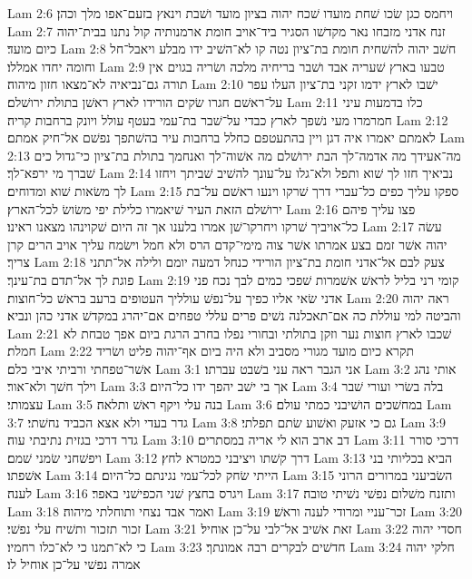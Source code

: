 Lam 2:6  ויחמס כגן שׂכו שׁחת מועדו שׁכח יהוה בציון מועד ושׁבת וינאץ בזעם־אפו מלך וכהן׃
Lam 2:7  זנח אדני מזבחו נאר מקדשׁו הסגיר ביד־אויב חומת ארמנותיה קול נתנו בבית־יהוה כיום מועד׃
Lam 2:8  חשׁב יהוה להשׁחית חומת בת־ציון נטה קו לא־השׁיב ידו מבלע ויאבל־חל וחומה יחדו אמללו׃
Lam 2:9  טבעו בארץ שׁעריה אבד ושׁבר בריחיה מלכה ושׂריה בגוים אין תורה גם־נביאיה לא־מצאו חזון מיהוה׃
Lam 2:10  ישׁבו לארץ ידמו זקני בת־ציון העלו עפר על־ראשׁם חגרו שׂקים הורידו לארץ ראשׁן בתולת ירושׁלם׃
Lam 2:11  כלו בדמעות עיני חמרמרו מעי נשׁפך לארץ כבדי על־שׁבר בת־עמי בעטף עולל ויונק ברחבות קריה׃
Lam 2:12  לאמתם יאמרו איה דגן ויין בהתעטפם כחלל ברחבות עיר בהשׁתפך נפשׁם אל־חיק אמתם׃
Lam 2:13  מה־אעידך מה אדמה־לך הבת ירושׁלם מה אשׁוה־לך ואנחמך בתולת בת־ציון כי־גדול כים שׁברך מי ירפא־לך׃
Lam 2:14  נביאיך חזו לך שׁוא ותפל ולא־גלו על־עונך להשׁיב שׁביתך ויחזו לך משׂאות שׁוא ומדוחים׃
Lam 2:15  ספקו עליך כפים כל־עברי דרך שׁרקו וינעו ראשׁם על־בת ירושׁלם הזאת העיר שׁיאמרו כלילת יפי משׂושׂ לכל־הארץ׃
Lam 2:16  פצו עליך פיהם כל־אויביך שׁרקו ויחרקו־שׁן אמרו בלענו אך זה היום שׁקוינהו מצאנו ראינו׃
Lam 2:17  עשׂה יהוה אשׁר זמם בצע אמרתו אשׁר צוה מימי־קדם הרס ולא חמל וישׂמח עליך אויב הרים קרן צריך׃
Lam 2:18  צעק לבם אל־אדני חומת בת־ציון הורידי כנחל דמעה יומם ולילה אל־תתני פוגת לך אל־תדם בת־עינך׃
Lam 2:19  קומי רני בליל לראשׁ אשׁמרות שׁפכי כמים לבך נכח פני אדני שׂאי אליו כפיך על־נפשׁ עולליך העטופים ברעב בראשׁ כל־חוצות׃
Lam 2:20  ראה יהוה והביטה למי עוללת כה אם־תאכלנה נשׁים פרים עללי טפחים אם־יהרג במקדשׁ אדני כהן ונביא׃
Lam 2:21  שׁכבו לארץ חוצות נער וזקן בתולתי ובחורי נפלו בחרב הרגת ביום אפך טבחת לא חמלת׃
Lam 2:22  תקרא כיום מועד מגורי מסביב ולא היה ביום אף־יהוה פליט ושׂריד אשׁר־טפחתי ורביתי איבי כלם׃
Lam 3:1  אני הגבר ראה עני בשׁבט עברתו׃
Lam 3:2  אותי נהג וילך חשׁך ולא־אור׃
Lam 3:3  אך בי ישׁב יהפך ידו כל־היום׃
Lam 3:4  בלה בשׂרי ועורי שׁבר עצמותי׃
Lam 3:5  בנה עלי ויקף ראשׁ ותלאה׃
Lam 3:6  במחשׁכים הושׁיבני כמתי עולם׃
Lam 3:7  גדר בעדי ולא אצא הכביד נחשׁתי׃
Lam 3:8  גם כי אזעק ואשׁוע שׂתם תפלתי׃
Lam 3:9  גדר דרכי בגזית נתיבתי עוה׃
Lam 3:10  דב ארב הוא לי אריה במסתרים׃
Lam 3:11  דרכי סורר ויפשׁחני שׂמני שׁמם׃
Lam 3:12  דרך קשׁתו ויציבני כמטרא לחץ׃
Lam 3:13  הביא בכליותי בני אשׁפתו׃
Lam 3:14  הייתי שׂחק לכל־עמי נגינתם כל־היום׃
Lam 3:15  השׂביעני במרורים הרוני לענה׃
Lam 3:16  ויגרס בחצץ שׁני הכפישׁני באפר׃
Lam 3:17  ותזנח משׁלום נפשׁי נשׁיתי טובה׃
Lam 3:18  ואמר אבד נצחי ותוחלתי מיהוה׃
Lam 3:19  זכר־עניי ומרודי לענה וראשׁ׃
Lam 3:20  זכור תזכור ותשׁיח עלי נפשׁי׃
Lam 3:21  זאת אשׁיב אל־לבי על־כן אוחיל׃
Lam 3:22  חסדי יהוה כי לא־תמנו כי לא־כלו רחמיו׃
Lam 3:23  חדשׁים לבקרים רבה אמונתך׃
Lam 3:24  חלקי יהוה אמרה נפשׁי על־כן אוחיל לו׃
